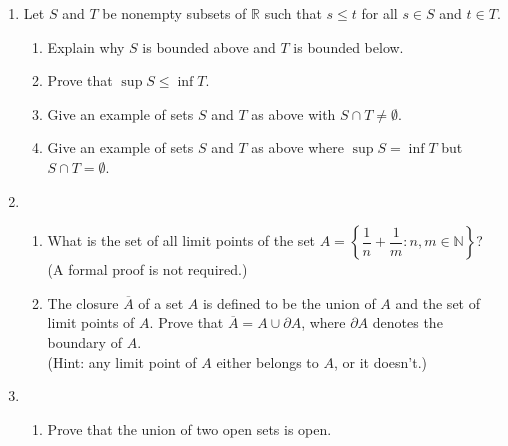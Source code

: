 \documentclass[12pt]{article}
\newcommand{\points}[1]{\marginpar{\hspace{24pt}[#1]}}
\newcommand{\R}{\mathbb{R}}
\newcommand{\N}{\mathbb{N}}
\begin{document}
\begin{enumerate}
\item Let $S$ and $T$ be nonempty subsets of $\R$ such that $s\leq t$ for all $s\in S$ and $t\in T$.
\begin{enumerate}
 \item Explain why $S$ is bounded above and $T$ is bounded below. \points{1}

\vspace{1.25in}

 \item Prove that $\sup S\leq \inf T$. \points{5}

\vspace{3.5in}

 \item Give an example of sets $S$ and $T$ as above with $S\cap T\neq \emptyset.$\points{2}

\vspace{1.5in}

 \item Give an example of sets $S$ and $T$ as above where $\sup S = \inf T$ but $S\cap T=\emptyset$. \points{2}

      \end{enumerate}
\newpage
\item \begin{enumerate}
       \item What is the set of all limit points of the set $A = \left\{\dfrac{1}{n}+\dfrac{1}{m} : n,m\in\N\right\}$? \points{4}\\ (A formal proof is not required.)

\vspace{3in}

       \item The closure $\overline{A}$ of a set $A$ is defined to be the union of $A$ and the set of limit points of $A$. \points{6} Prove that $\overline{A} = A\cup \partial A$, where $\partial A$ denotes the boundary of $A$.\\
(Hint: any limit point of $A$ either belongs to $A$, or it doesn't.)

      \end{enumerate}
\newpage

\item \begin{enumerate}
\item Prove that the union of two open sets is open. \points{4}

\vspace{3.25in}


\end{enumerate}
\end{enumerate}
\end{document}
